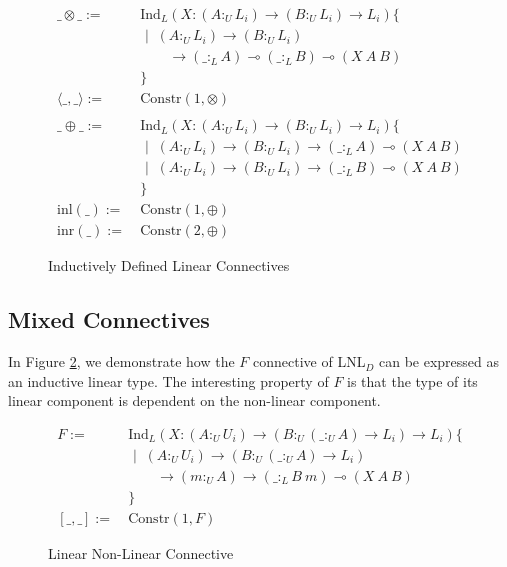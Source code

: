 \documentclass[sigplan,screen,review,authordraft]{acmart}
\newcommand{\ind}[1]{\text{Ind}_{#1}}
\newcommand{\constr}{\text{Constr}}
\newcommand{\sep}{\text{ | }}
\newcommand{\utype}{:_{\scriptscriptstyle U}}
\newcommand{\ltype}{:_{\scriptscriptstyle L}}
\newcommand{\lrangle}[1]{\langle #1 \rangle}
\newcommand{\inl}{\text{inl}}
\newcommand{\inr}{\text{inr}}
\begin{document}
\begin{figure}[h]
  \caption{Inductively Defined Linear Connectives}
  \begin{align*}
    \_\otimes\_ :=\
     & \ind{L}(X : (A \utype L_i) \rightarrow (B \utype L_i) \rightarrow L_i)\{      \\
     & \sep\ (A \utype L_i) \rightarrow (B \utype L_i)                               \\
     & \qquad \rightarrow (\_ \ltype A)  \multimap (\_ \ltype B) \multimap (X\ A\ B) \\
     & \}
    \\
    \lrangle{\_,\_} := \
     & \constr(1, \otimes)
    \\\\
    \_\oplus\_ := \
     & \ind{L}(X : (A \utype L_i) \rightarrow (B \utype L_i) \rightarrow L_i)\{      \\
     & \sep \ (A \utype L_i) \rightarrow (B \utype L_i)
    \rightarrow (\_ \ltype A)  \multimap (X\ A\ B)                                   \\
     & \sep \ (A \utype L_i) \rightarrow (B \utype L_i)
    \rightarrow (\_ \ltype B)  \multimap (X\ A\ B)                                   \\
     & \}
    \\
    \inl(\_) := \
     & \constr(1, \oplus)
    \\
    \inr(\_) := \
     & \constr(2, \oplus)
  \end{align*}
  \Description{}
  \label{lconnectives}
\end{figure}

\subsection{Mixed Connectives}
In Figure \ref{mconnectives}, we demonstrate how the $F$ connective of LNL$_D$ \cite{neel15} can be expressed as an inductive linear type. The interesting property of $F$ is that the type of its linear component is dependent on the non-linear component.

\begin{figure}[h]
  \caption{Linear Non-Linear Connective}
  \begin{align*}
    F := \
     & \ind{L}(X : (A \utype U_i) \rightarrow
    (B \utype (\_ \utype A) \rightarrow L_i) \rightarrow L_i)\{ \\
     & \sep \ (A \utype U_i) \rightarrow
    (B \utype (\_ \utype A) \rightarrow L_i)                    \\
     & \qquad \rightarrow (m \utype A) \rightarrow
    (\_ \ltype B\ m) \multimap (X\ A\ B)                        \\
     & \}
    \\
    [\_,\_] :=\
     & \constr(1, F)
  \end{align*}
  \Description{}
  \label{mconnectives}
\end{figure}
\end{document}
